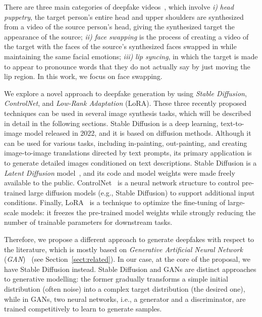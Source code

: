 \documentclass[sn-mathphys,Numbered]{sn-jnl}
\theoremstyle{thmstyleone}%
\theoremstyle{thmstyletwo}%
\theoremstyle{thmstylethree}%
\begin{document}
There are three main categories of deepfake videos~\cite{lyu}, which involve \emph{i)} \emph{head puppetry}, the target person's entire head and upper shoulders are synthesized from a video of the source person's head, giving the synthesized target the appearance of the source; \emph{ii)} \emph{face swapping} is the process of creating a video of the target with the faces of the source's synthesized faces swapped in while maintaining the same facial emotions; \emph{iii)} \emph{lip syncing}, in which the target is made to appear to pronounce words that they do not actually say by just moving the lip region. In this work, we focus on face swapping.


We  explore a novel approach to deepfake generation by using  \emph{Stable Diffusion}, \emph{ControlNet}, and \emph{Low-Rank Adaptation} (LoRA). These three recently proposed techniques can be used in several image synthesis tasks, which will be described in detail in the following sections. Stable Diffusion is a deep learning, text-to-image model released in 2022,  and it is based on diffusion methods. Although it can be used for various tasks, including in-painting, out-painting, and creating image-to-image translations directed by text prompts, its primary application is to generate detailed images conditioned on text descriptions. Stable Diffusion is a \emph{Latent Diffusion} model~\cite{rombach2022highresolution}, and its code and model weights were made freely available to the public.
ControlNet~\cite{zhang2023adding} is a neural network structure to control pre-trained large diffusion models (e.g., Stable Diffusion) to support additional input conditions. Finally, LoRA~\cite{hu2021lora} is a technique to optimize the fine-tuning of large-scale models: it freezes the pre-trained model weights while strongly reducing the number of trainable parameters for downstream tasks.

Therefore, we propose a different approach to generate deepfakes with respect to the literature, which is mostly based on \emph{Generative Artificial Neural Network} (\emph{GAN})~\cite{surveydgen1} (see Section~\ref{sect:related}). In our case, at the core of the proposal, we have Stable Diffusion instead. Stable Diffusion and GANs are distinct approaches to generative modelling: the former gradually transforms a simple initial distribution (often noise) into a complex target distribution (the desired one), while in GANs, two neural networks, i.e., a generator and a discriminator, are trained competitively  to learn to generate samples. 
\end{document}
